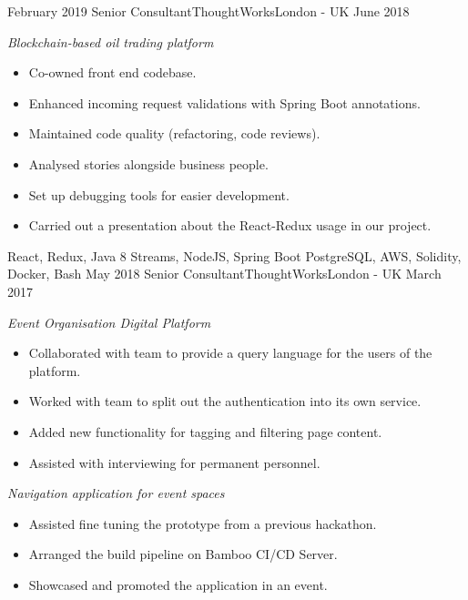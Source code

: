%
%
%

  \begin{experiences}
    \experience
      {February 2019}
      {Senior Consultant}{ThoughtWorks}{London - UK}
      {June 2018}
      {
        \emph{Blockchain-based oil trading platform}
        \begin{itemize}
          \item Co-owned front end codebase.
          \item Enhanced incoming request validations with Spring Boot annotations.
          \item Maintained code quality (refactoring, code reviews).
          \item Analysed stories alongside business people.
          \item Set up debugging tools for easier development.
          \item Carried out a presentation about the React-Redux usage in our project.
        \end{itemize}
      }
      {React, Redux, Java 8 Streams, NodeJS, Spring Boot}
      {PostgreSQL, AWS, Solidity, Docker, Bash}
    \emptySeparator
    \experience
      {May 2018}
      {Senior Consultant}{ThoughtWorks}{London - UK}
      {March 2017}
      {
        \emph{Event Organisation Digital Platform}
        \begin{itemize}
          \item Collaborated with team to provide a query language for the users of the platform.
          \item Worked with team to split out the authentication into its own service.
          \item Added new functionality for tagging and filtering page content.
          \item Assisted with interviewing for permanent personnel.
        \end{itemize}

        \emph{Navigation application for event spaces}
        \begin{itemize}
          \item Assisted fine tuning the prototype from a previous hackathon.
          \item Arranged the build pipeline on Bamboo CI/CD Server.
          \item Showcased and promoted the application in an event.
        \end{itemize}

}
\end{experiences}
